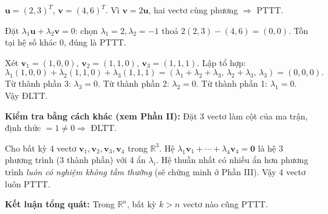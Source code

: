 \documentclass[12pt,a4paper]{article}
\begin{document}
\begin{center}
\end{center}

\begin{vidu}[title={Hai vectơ trong $\mathbb{R}^2$ -- kiểm tra bằng tỉ lệ}]
$\mathbf{u} = (2,3)^T$, $\mathbf{v} = (4,6)^T$. Vì $\mathbf{v} = 2\mathbf{u}$, hai vectơ cùng phương $\Rightarrow$ PTTT.

Đặt $\lambda_1\mathbf{u} + \lambda_2\mathbf{v} = 0$: chọn $\lambda_1 = 2, \lambda_2 = -1$ thoả $2(2,3) - (4,6) = (0,0)$. Tồn tại hệ số khác 0, đúng là PTTT.
\end{vidu}

\begin{vidu}[title={Ba vectơ trong $\mathbb{R}^3$}]
Xét $\mathbf{v}_1 = (1,0,0)$, $\mathbf{v}_2 = (1,1,0)$, $\mathbf{v}_3 = (1,1,1)$. Lập tổ hợp:
\[
  \lambda_1(1,0,0) + \lambda_2(1,1,0) + \lambda_3(1,1,1) = (\lambda_1+\lambda_2+\lambda_3,\, \lambda_2+\lambda_3,\, \lambda_3) = (0,0,0).
\]
Từ thành phần 3: $\lambda_3 = 0$. Từ thành phần 2: $\lambda_2 = 0$. Từ thành phần 1: $\lambda_1 = 0$. Vậy ĐLTT.

\textbf{Kiểm tra bằng cách khác (xem Phần II):} Đặt 3 vectơ làm cột của ma trận, định thức $= 1 \ne 0 \Rightarrow$ ĐLTT.
\end{vidu}

\begin{vidu}[title={Bốn vectơ trong $\mathbb{R}^3$ -- bắt buộc PTTT}]
Cho bất kỳ 4 vectơ $\mathbf{v}_1, \mathbf{v}_2, \mathbf{v}_3, \mathbf{v}_4$ trong $\mathbb{R}^3$. Hệ $\lambda_1\mathbf{v}_1 + \cdots + \lambda_4\mathbf{v}_4 = \mathbf{0}$ là hệ 3 phương trình (3 thành phần) với 4 ẩn $\lambda_i$. Hệ thuần nhất có nhiều ẩn hơn phương trình \emph{luôn có nghiệm không tầm thường} (sẽ chứng minh ở Phần III). Vậy 4 vectơ luôn PTTT.

\textbf{Kết luận tổng quát:} Trong $\mathbb{R}^n$, bất kỳ $k > n$ vectơ nào cũng PTTT.
\end{vidu}
\end{document}
